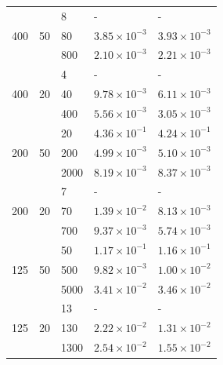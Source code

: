 \begin{table}
\begin{tabular}{lllll}
    \hline
    \multirow{3}{*}{ 400}  & \multirow{3}{*}{ 50} & 8    & -        & -                                  \\
                           &                      & 80   & $3.85 \times 10^{-3}$ & $3.93 \times 10^{-3}$ \\
                           &                      & 800  & $2.10 \times 10^{-3}$ & $2.21 \times 10^{-3}$ \\
    \hline
    \multirow{3}{*}{ 400}  & \multirow{3}{*}{ 20} & 4    & -        & -                                  \\
                           &                      & 40   & $9.78 \times 10^{-3}$ & $6.11 \times 10^{-3}$ \\
                           &                      & 400  & $5.56 \times 10^{-3}$ & $3.05 \times 10^{-3}$ \\
    \hline
    \multirow{3}{*}{ 200}  & \multirow{3}{*}{ 50} & 20   & $4.36 \times 10^{-1}$ & $4.24 \times 10^{-1}$ \\
                           &                      & 200  & $4.99 \times 10^{-3}$ & $5.10 \times 10^{-3}$ \\
                           &                      & 2000 & $8.19 \times 10^{-3}$ & $8.37 \times 10^{-3}$ \\
    \hline
    \multirow{3}{*}{ 200}  & \multirow{3}{*}{ 20} & 7    & -        & -                                  \\
                           &                      & 70   & $1.39 \times 10^{-2}$ & $8.13 \times 10^{-3}$ \\
                           &                      & 700  & $9.37 \times 10^{-3}$ & $5.74 \times 10^{-3}$ \\
    \hline
    \multirow{3}{*}{ 125}  & \multirow{3}{*}{ 50} & 50   & $1.17 \times 10^{-1}$ & $1.16 \times 10^{-1}$ \\
                           &                      & 500  & $9.82 \times 10^{-3}$ & $1.00 \times 10^{-2}$ \\
                           &                      & 5000 & $3.41 \times 10^{-2}$ & $3.46 \times 10^{-2}$ \\
    \hline
    \multirow{3}{*}{ 125}  & \multirow{3}{*}{ 20} & 13   & -        & -                                  \\
                           &                      & 130  & $2.22 \times 10^{-2}$ & $1.31 \times 10^{-2}$ \\
                           &                      & 1300 & $2.54 \times 10^{-2}$ & $1.55 \times 10^{-2}$ \\

\end{tabular}
\end{table}
